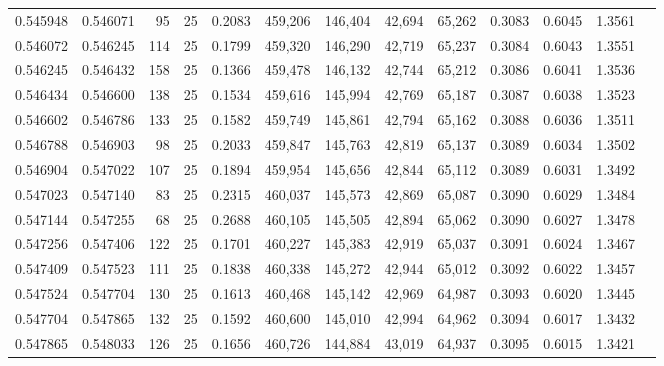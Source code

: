 \begin{tabular}{rrrrrrrrrrrrr}
0.545948 & 0.546071 &    95 &  25 &                                     0.2083 & 459,206 & 146,404 &  42,694 &  65,262 & 0.3083 & 0.6045 & 1.3561 \\
0.546072 & 0.546245 &   114 &  25 &                                     0.1799 & 459,320 & 146,290 &  42,719 &  65,237 & 0.3084 & 0.6043 & 1.3551 \\
0.546245 & 0.546432 &   158 &  25 &                                     0.1366 & 459,478 & 146,132 &  42,744 &  65,212 & 0.3086 & 0.6041 & 1.3536 \\
0.546434 & 0.546600 &   138 &  25 &                                     0.1534 & 459,616 & 145,994 &  42,769 &  65,187 & 0.3087 & 0.6038 & 1.3523 \\
0.546602 & 0.546786 &   133 &  25 &                                     0.1582 & 459,749 & 145,861 &  42,794 &  65,162 & 0.3088 & 0.6036 & 1.3511 \\
0.546788 & 0.546903 &    98 &  25 &                                     0.2033 & 459,847 & 145,763 &  42,819 &  65,137 & 0.3089 & 0.6034 & 1.3502 \\
0.546904 & 0.547022 &   107 &  25 &                                     0.1894 & 459,954 & 145,656 &  42,844 &  65,112 & 0.3089 & 0.6031 & 1.3492 \\
0.547023 & 0.547140 &    83 &  25 &                                     0.2315 & 460,037 & 145,573 &  42,869 &  65,087 & 0.3090 & 0.6029 & 1.3484 \\
0.547144 & 0.547255 &    68 &  25 &                                     0.2688 & 460,105 & 145,505 &  42,894 &  65,062 & 0.3090 & 0.6027 & 1.3478 \\
0.547256 & 0.547406 &   122 &  25 &                                     0.1701 & 460,227 & 145,383 &  42,919 &  65,037 & 0.3091 & 0.6024 & 1.3467 \\
0.547409 & 0.547523 &   111 &  25 &                                     0.1838 & 460,338 & 145,272 &  42,944 &  65,012 & 0.3092 & 0.6022 & 1.3457 \\
0.547524 & 0.547704 &   130 &  25 &                                     0.1613 & 460,468 & 145,142 &  42,969 &  64,987 & 0.3093 & 0.6020 & 1.3445 \\
0.547704 & 0.547865 &   132 &  25 &                                     0.1592 & 460,600 & 145,010 &  42,994 &  64,962 & 0.3094 & 0.6017 & 1.3432 \\
0.547865 & 0.548033 &   126 &  25 &                                     0.1656 & 460,726 & 144,884 &  43,019 &  64,937 & 0.3095 & 0.6015 & 1.3421 \\

\end{tabular}
